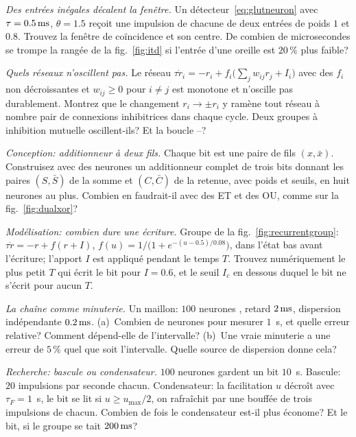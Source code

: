 \begin{exercise}[\lvlB]
\label{ex:02:2}
\emph{Des entrées inégales décalent la fenêtre.} Un détecteur~\eqref{eq:glutneuron} avec $\tau=0.5\,\text{ms}$, $\theta=1.5$ reçoit une impulsion de chacune de deux entrées de poids $1$ et $0.8$. Trouvez la fenêtre de coïncidence et son centre. De combien de microsecondes se trompe la rangée de la fig.~\ref{fig:itd} si l'entrée d'une oreille est $20\,\%$ plus faible?
\end{exercise}

\begin{exercise}[\lvlB]
\label{ex:02:3}
\emph{Quels réseaux n'oscillent pas.} Le réseau $\tau\dot r_i=-r_i+f_i\bigl(\textstyle\sum_jw_{ij}r_j+I_i\bigr)$ avec des $f_i$ non décroissantes et $w_{ij}\ge0$ pour $i\ne j$ est monotone et n'oscille pas durablement. Montrez que le changement $r_i\to\pm r_i$ y ramène tout réseau à nombre pair de connexions inhibitrices dans chaque cycle. Deux groupes à inhibition mutuelle oscillent-ils? Et la boucle --?
\end{exercise}

\begin{exercise}[\lvlB]
\label{ex:02:4}
\emph{Conception: additionneur à deux fils.} Chaque bit est une paire de fils $(x,\bar x)$. Construisez avec des neurones  un additionneur complet de trois bits donnant les paires $(S,\bar S)$ de la somme et $(C,\bar C)$ de la retenue, avec poids et seuils, en huit neurones au plus. Combien en faudrait-il avec des ET et des OU, comme sur la fig.~\ref{fig:dualxor}?
\end{exercise}

\begin{exercise}[\lvlB]
\label{ex:02:5}
\emph{Modélisation: combien dure une écriture.} Groupe de la fig.~\ref{fig:recurrentgroup}: $\tau\dot r=-r+f(r+I)$, $f(u)=1/\bigl(1+e^{-(u-0.5)/0.08}\bigr)$, dans l'état bas avant l'écriture; l'apport $I$ est appliqué pendant le temps $T$. Trouvez numériquement le plus petit $T$ qui écrit le bit pour $I=0.6$, et le seuil $I_c$ en dessous duquel le bit ne s'écrit pour aucun $T$.
\end{exercise}

\begin{exercise}[\lvlA]
\label{ex:02:6}
\emph{La chaîne comme minuterie.} Un maillon: $100$ neurones , retard $2\,\text{ms}$, dispersion indépendante $0.2\,\text{ms}$. (a)~Combien de neurones pour mesurer $1$~s, et quelle erreur relative? Comment dépend-elle de l'intervalle? (b)~Une vraie minuterie a une erreur de $5\,\%$ quel que soit l'intervalle. Quelle source de dispersion donne cela?
\end{exercise}

\begin{exercise}[\lvlC]
\label{ex:02:7}
\emph{Recherche: bascule ou condensateur.} $100$ neurones gardent un bit $10$~s. Bascule: $20$ impulsions par seconde chacun. Condensateur: la facilitation $u$ décroît avec $\tau_F=1$~s, le bit se lit si $u\ge u_{\max}/2$, on rafraîchit par une bouffée de trois impulsions de chacun. Combien de fois le condensateur est-il plus économe? Et le bit, si le groupe se tait $200\,\text{ms}$?
\end{exercise}
